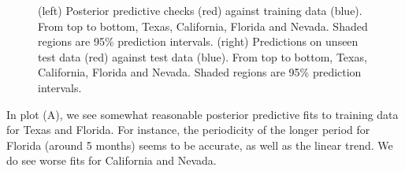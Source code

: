\documentclass{article}
\begin{document}
\begin{figure}[H]
    \centering
    \quad
    \caption{(left) Posterior predictive checks (red) against training data (blue). From top to bottom, Texas, California, Florida and Nevada. Shaded regions are 95\% prediction intervals. (right) Predictions on unseen test data (red) against test data (blue). From top to bottom, Texas, California, Florida and Nevada. Shaded regions are 95\% prediction intervals. }
\end{figure}

In plot (A), we see somewhat reasonable posterior predictive fits to training data for Texas and Florida. For instance, the periodicity of the longer period for Florida (around 5 months) seems to be accurate, as well as the linear trend. We do see worse fits for California and Nevada. 
\end{document}
